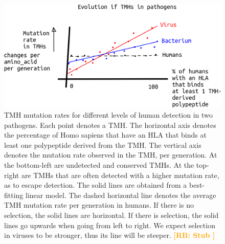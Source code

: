 \documentclass{article}
\newcommand{\richel}[1]{\textcolor{orange}{\textbf{[RB: #1]}}}
\begin{document}
\begin{figure}[!htbp]
  \includegraphics[width=\textwidth]{fig_tmh_mut_rate.png}
  \caption{
    TMH mutation rates for different levels of human detection in
    two pathogens.
    Each point denotes a TMH.
    The horizontal axis denotes the percentage of Homo sapiens that
    have an HLA that binds at least one polypeptide derived from the TMH.
    The vertical axis denotes the mutation rate observed in the TMH, 
    per generation.
    At the bottom-left are undetected and conserved TMHs.
    At the top-right are TMHs that are often detected with a higher mutation
    rate, as to escape detection.
    The solid lines are obtained from a best-fitting linear model.
    The dashed horizontal line denotes the average TMH mutation rate 
    per generation in humans.
    If there is no selection, the solid lines are horizontal.
    If there is selection, the solid lines go upwards when going from left to right.
    We expect selection in viruses to be stronger, thus its line will be steeper.
    \richel{
      Stub
    }
  }
  \label{fig:tmh_mut_rate}
\end{figure}







\end{document}
